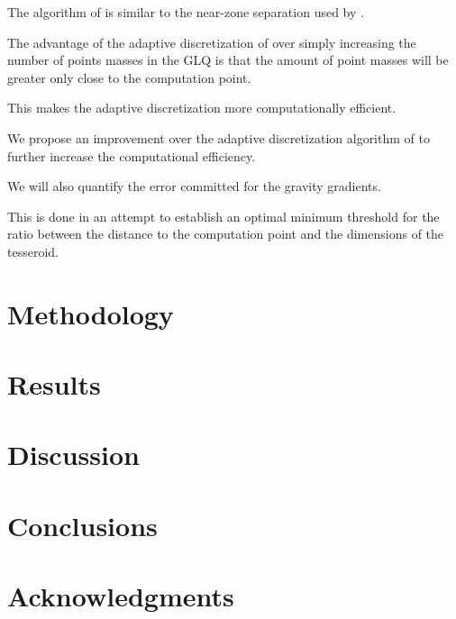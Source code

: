 \documentclass[extra,mreferee]{gji}
\begin{document}
The algorithm of \citet{Li2011} is similar to the near-zone separation used by
\citet{Grombein2013}.

The advantage of the adaptive discretization of \citet{Li2011} over simply
increasing the number of points masses in the GLQ is that the
amount of point masses will be greater only close to the computation point.

This makes the adaptive discretization more computationally efficient.

We propose an improvement over the adaptive discretization algorithm of
\citet{Li2011} to further increase the computational efficiency.

We will also quantify the error committed for the gravity gradients.

This is done in an attempt to establish an optimal minimum threshold for the
ratio between the distance to the computation point and the dimensions of the
tesseroid.


\section{Methodology}


\section{Results}


\section{Discussion}

\section{Conclusions}

\section{Acknowledgments}




\end{document}
